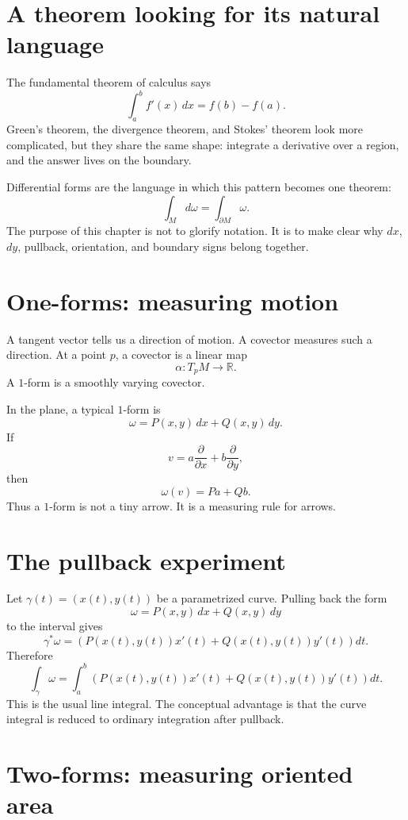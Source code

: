 
\section{A theorem looking for its natural language}

The fundamental theorem of calculus says
\[
  \int_a^b f'(x)\,dx=f(b)-f(a).
\]
Green's theorem, the divergence theorem, and Stokes' theorem look more complicated, but they share the same shape: integrate a derivative over a region, and the answer lives on the boundary.

Differential forms are the language in which this pattern becomes one theorem:
\[
  \int_M d\omega=\int_{\partial M}\omega.
\]
The purpose of this chapter is not to glorify notation. It is to make clear why \(dx\), \(dy\), pullback, orientation, and boundary signs belong together.

\section{One-forms: measuring motion}

A tangent vector tells us a direction of motion. A covector measures such a direction. At a point \(p\), a covector is a linear map
\[
  \alpha:T_pM\to\mathbb R.
\]
A \(1\)-form is a smoothly varying covector.

In the plane, a typical \(1\)-form is
\[
  \omega=P(x,y)\,dx+Q(x,y)\,dy.
\]
If
\[
  v=a\frac{\partial}{\partial x}+b\frac{\partial}{\partial y},
\]
then
\[
  \omega(v)=Pa+Qb.
\]
Thus a \(1\)-form is not a tiny arrow. It is a measuring rule for arrows.

\section{The pullback experiment}

Let \(\gamma(t)=(x(t),y(t))\) be a parametrized curve. Pulling back the form
\[
  \omega=P(x,y)\,dx+Q(x,y)\,dy
\]
to the interval gives
\[
  \gamma^*\omega=
  \left(P(x(t),y(t))x'(t)+Q(x(t),y(t))y'(t)\right)dt.
\]
Therefore
\[
  \int_\gamma\omega=
  \int_a^b
  \left(P(x(t),y(t))x'(t)+Q(x(t),y(t))y'(t)\right)dt.
\]
This is the usual line integral. The conceptual advantage is that the curve integral is reduced to ordinary integration after pullback.

\section{Two-forms: measuring oriented area}

